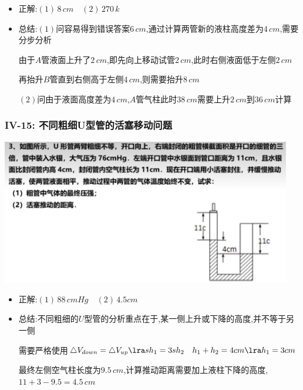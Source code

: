 \documentclass{article}
\begin{document}
\begin{itemize}
    \item 正解:\quad $(1) \, 8 \, cm \quad (2) \, 270 \, k$
    \item 总结:\quad $(1)$问容易得到错误答案$6 \, cm$,通过计算两管新的液柱高度差为$4 \, cm$,需要分步分析
    
    \hspace{3.2em}由于$A$管液面上升了$2 \, cm$,即先向上移动试管$2 \, cm$,此时右侧液面低于左侧$2 \, cm$

    \hspace{3.2em}再抬升$B$管直到右侧高于左侧$4 \, cm$,则需要抬升$8 \, cm$

    \hspace{3.2em}$(2)$问由于液面高度差为$4 \, cm $,$A$管气柱此时$38 \, cm$需要上升$2 \,cm$到$36 \, cm$计算
\end{itemize}

\vspace{2em}

\subsubsection{IV-15: 不同粗细U型管的活塞移动问题}
\includegraphics[width = 0.95\textwidth,keepaspectratio]{./pictures/2.3-27.png}

\begin{itemize}
    \item 正解:\quad $(1) \, 88 \, cmHg \quad (2) \, 4.5 cm $
    \item 总结:\quad 不同粗细的$U$型管的分析重点在于,某一侧上升或下降的高度,并不等于另一侧
    
    \hspace{3.2em}需要严格使用$ \triangle V_{down} = \triangle V_{up} \lra 
    sh_{1} = 3 s h_{2} \quad h_{1} + h_{2} = 4 cm \lra h_{1} = 3cm$

    \hspace{3.2em}最终左侧空气柱长度为$9.5 \, cm$,计算推动距离需要加上液柱下降的高度,$11+3-9.5=4.5 \, cm$
\end{itemize}
\end{document}
